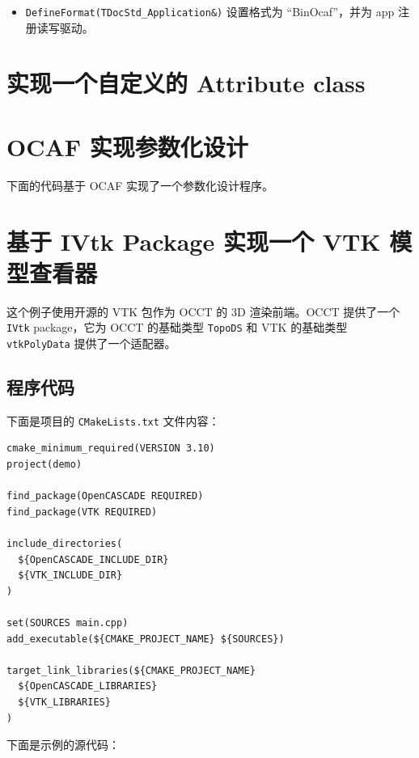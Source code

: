 \documentclass[11pt]{article}
\let\oldsection\section
\renewcommand{\section}{\clearpage\oldsection}
\begin{document}
\begin{itemize}
\item \texttt{DefineFormat(TDocStd\_Application\&)} 设置格式为 ``BinOcaf''，并为 app 注册读写驱动。
\end{itemize}
\section{实现一个自定义的 Attribute class}
\label{sec:org802a114}




\section{OCAF 实现参数化设计}
\label{sec:org48b1c85}

下面的代码基于 OCAF 实现了一个参数化设计程序。
\section{基于 IVtk Package 实现一个 VTK 模型查看器}
\label{sec:org9ef91f0}

这个例子使用开源的 VTK 包作为 OCCT 的 3D 渲染前端。OCCT 提供了一个 \texttt{IVtk} package，它为 OCCT 的基础类型 \texttt{TopoDS} 和 VTK 的基础类型 \texttt{vtkPolyData} 提供了一个适配器。
\subsection{程序代码}
\label{sec:org692b214}

下面是项目的 \texttt{CMakeLists.txt} 文件内容：

\begin{verbatim}
cmake_minimum_required(VERSION 3.10)
project(demo)

find_package(OpenCASCADE REQUIRED)
find_package(VTK REQUIRED)

include_directories(
  ${OpenCASCADE_INCLUDE_DIR}
  ${VTK_INCLUDE_DIR}
)

set(SOURCES main.cpp)
add_executable(${CMAKE_PROJECT_NAME} ${SOURCES})

target_link_libraries(${CMAKE_PROJECT_NAME}
  ${OpenCASCADE_LIBRARIES}
  ${VTK_LIBRARIES}
)
\end{verbatim}

下面是示例的源代码：
\end{document}
